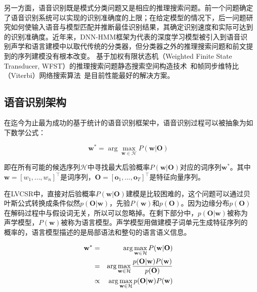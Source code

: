 另一方面，语音识别既是模式分类问题又是相应的推理搜索问题。前一个问题确定了语音识别系统可以实现的识别准确度的上限；在给定模型的情况下，后一问题研究如何使输入语音与模型匹配并推断最佳识别结果，其确定识别速度和实际可达到的识别准确度。近年来，DNN-HMM框架为代表的深度学习模型被引入到语音识别声学和语言建模中以取代传统的分类器，但分类器之外的推理搜索问题和前文提到的序列建模没有根本改变。
基于加权有限状态机（Weighted Finite State Transducer, WFST）的推理搜索问题静态搜索空间构造技术~\cite{mohri2002weighted}和帧同步维特比（Viterbi）网络搜索算法~\cite{forney1973viterbi}是目前性能最好的解决方案。

\subsection{语音识别架构}
\label{chap:intro0-asr-framework}


在迄今为止最为成功的基于统计的语音识别框架中，语音识别过程可以被抽象为如下数学公式：

\begin{equation}
    \label{eq:asr}
    \mathbf{w}^* = \arg \max_{\mathbf{w} \in \mathcal{H}}P(\mathbf{w}|\mathbf{O})
\end{equation}

即在所有可能的候选序列$\mathcal{H}$中寻找最大后验概率$P(\mathbf{w}|\mathbf{O})$对应的词序列$\mathbf{w}^*$。其中$\mathbf{w}=\left[ w_1, ..., w_n \right]^\top$是词序列，$\mathbf{O}=\left[ \mathbf{o}_1, ..., \mathbf{o}_T \right]^\top$是特征向量序列。


在LVCSR中，直接对后验概率$P(\mathbf{w}|\mathbf{O})$建模是比较困难的，这个问题可以通过贝叶斯公式转换成条件似然$p(\mathbf{O}|\mathbf{w})$，先验$P(\mathbf{w})$和$p(\mathbf{O})$。因为边缘分布$p(\mathbf{O})$在解码过程中与假设词无关，所以可以忽略掉。在剩下部分中，$p(\mathbf{O}|\mathbf{w})$被称为声学模型，$P(\mathbf{w})$被称为语言模型。声学模型用做建模子词单元生成特征序列的概率的，语言模型描述的是局部语法和整句的语言语义信息。



\begin{eqnarray*}
    \centering
    \mathbf{w}^* &=& \arg \max_{\mathbf{w} \in \mathcal{H}}P(\mathbf{w}|\mathbf{O}) \\
    &=& \arg \max_{\mathbf{w} \in \mathcal{H}} \frac{p(\mathbf{O}|\mathbf{w})P(\mathbf{w})}{p(\mathbf{O})} \\
    &\propto& \arg \max_{\mathbf{w} \in \mathcal{H}} p(\mathbf{O}|\mathbf{w})P(\mathbf{w}) \\
\end{eqnarray*}


